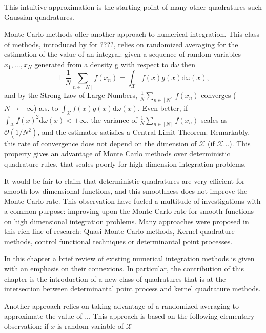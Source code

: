 \documentclass[twoside,11pt]{book}
\DeclareMathOperator{\EX}{\mathbb{E}}
\begin{document}
 


This intuitive approximation is the starting point of many other quadratures such Gaussian quadratures. 

Monte Carlo methods offer another approach to numerical integration. This class of methods, introduced by \cite{MeUl49} for ????,  relies on randomized averaging for the estimation of the value of an integral: given a sequence of random variables $x_{1}, \dots, x_{N}$ generated from a density g with respect to $\mathrm{d}\omega$ then
\begin{equation}
\EX \frac{1}{N}\sum\limits_{n \in [N]} f(x_{n}) = \int_{\mathcal{X}} f(x)g(x) \mathrm{d}\omega(x),
\end{equation}
and by the Strong Law of Large Numbers, $\displaystyle \frac{1}{N}\sum\limits_{n \in [N]} f(x_{n})$ converges ($N \rightarrow +\infty$) a.s. to $\displaystyle \int_{\mathcal{X}} f(x)g(x) \mathrm{d}\omega(x)$. Even better, if $\displaystyle \int_{\mathcal{X}} f(x)^{2} \mathrm{d}\omega(x) < +\infty$, the variance of $\displaystyle \frac{1}{N}\sum\limits_{n \in [N]} f(x_{n})$ scales as $\mathcal{O}(1/N^{2})$, and the estimator satisfies a Central Limit Theorem. 
Remarkably, this rate of convergence does not depend on the dimension of $\mathcal{X}$ (if $\mathcal{X}$...). This property gives an advantage of Monte Carlo methods over deterministic quadrature rules, that scales poorly for high dimension integration problems. 

It would be fair to claim that deterministic quadratures are very efficient for smooth low dimensional functions, and this smoothness does not improve the Monte Carlo rate. This observation have fueled a multitude of investigations with a common purpose: improving upon the Monte Carlo rate for smooth functions on high dimensional integration problems. Many approaches were proposed in this rich line of research: Quasi-Monte Carlo methods, Kernel quadrature methods, control functional techniques or  determinantal point processes.

In this chapter a brief review of existing numerical integration methods is given with an emphasis on their connexions. In particular, the contribution of this chapter is the introduction of a new class of quadratures that is at the intersection between determinantal point process and kernel quadrature methods.




Another approach relies on taking advantage of a randomized averaging to approximate the value of ... This approach is based on the following elementary observation: if $x$ is random variable of $\mathcal{X}$ 
\end{document}
